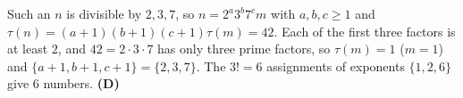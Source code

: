 Such an $n$ is divisible by $2,3,7$, so $n=2^a3^b7^c m$ with $a,b,c\ge1$ and $\tau(n)=(a+1)(b+1)(c+1)\tau(m)=42$. Each of the first three factors is at least $2$, and $42=2\cdot3\cdot7$ has only three prime factors, so $\tau(m)=1$ ($m=1$) and $\{a+1,b+1,c+1\}=\{2,3,7\}$. The $3!=6$ assignments of exponents $\{1,2,6\}$ give $6$ numbers. \textbf{(D)}
